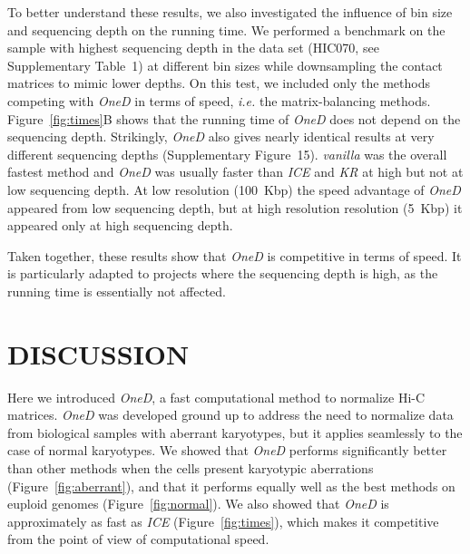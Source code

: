 \documentclass[a4,center,fleqn]{NAR}
\providecommand{\DIFadd}[1]{{\protect\color{red}#1}} %
\providecommand{\DIFdel}[1]{{\protect}}                      %
\providecommand{\DIFaddbegin}{} %
\providecommand{\DIFaddend}{} %
\providecommand{\DIFdelbegin}{} %
\providecommand{\DIFdelend}{} %
\begin{document}
To better understand these results, we also investigated the influence of
bin size and sequencing depth on the running time. We performed a
benchmark on the sample with highest sequencing depth in the data set
(HIC070, see Supplementary Table~1) at different bin sizes while
downsampling the contact matrices to mimic lower \DIFdelbegin \DIFdel{resolutions}\DIFdelend \DIFaddbegin \DIFadd{depths}\DIFaddend . On this
test, we included only the methods competing with \textit{OneD} in terms
of speed, \textit{i.e.} the matrix-balancing methods.
Figure~\ref{fig:times}B shows that the running time of \textit{OneD} does
not depend on the sequencing depth. Strikingly, \textit{OneD} also gives
nearly identical results at very different sequencing depths
(Supplementary Figure~\DIFdelbegin \DIFdel{13}\DIFdelend \DIFaddbegin \DIFadd{15}\DIFaddend ). \textit{vanilla} was the overall fastest method
and \textit{OneD} was usually faster than \textit{ICE} and \textit{KR}
at high but not at low sequencing depth. At low resolution (100~Kbp) the
speed advantage of \textit{OneD} appeared from low sequencing depth, but
at high resolution resolution (5~Kbp) it appeared only at high sequencing
depth.

Taken together, these results show that \textit{OneD} is competitive in
terms of speed. It is particularly adapted to projects where the
sequencing depth is high, as the running time is essentially not affected.



\section{DISCUSSION}

Here we introduced \textit{OneD}, a fast computational method to normalize
Hi-C matrices. \textit{OneD} was developed ground up to address the need
to normalize data from biological samples with aberrant karyotypes, but it
applies seamlessly to the case of normal karyotypes. We showed that
\textit{OneD} performs significantly better than other methods when the
cells present karyotypic aberrations (Figure~\ref{fig:aberrant}), and that
it performs equally well as the best methods on euploid genomes
(Figure~\ref{fig:normal}). We also showed that \textit{OneD} is
approximately as fast as \textit{ICE} (Figure~\ref{fig:times}), which
makes it competitive from the point of view of computational speed.
\end{document}
